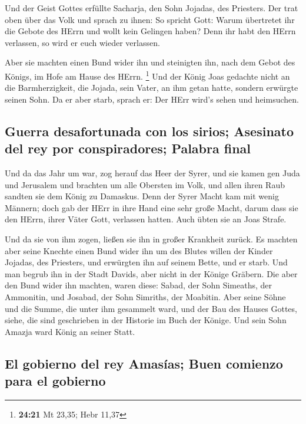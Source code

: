  Und der Geist Gottes erfüllte Sacharja, den Sohn
Jojadas, des Priesters. Der trat oben über das Volk und sprach zu ihnen:
So spricht Gott: Warum übertretet ihr die Gebote des HErrn und wollt
kein Gelingen haben? Denn ihr habt den HErrn verlassen, so wird er euch
wieder verlassen.

 Aber sie machten einen Bund wider ihn und steinigten
ihn, nach dem Gebot des Königs, im Hofe am Hause des HErrn. \footnote{\textbf{24:21}
  Mt 23,35; Hebr 11,37}  Und der König Joas gedachte
nicht an die Barmherzigkeit, die Jojada, sein Vater, an ihm getan hatte,
sondern erwürgte seinen Sohn. Da er aber starb, sprach er: Der HErr
wird's sehen und heimsuchen.

\hypertarget{guerra-desafortunada-con-los-sirios-asesinato-del-rey-por-conspiradores-palabra-final}{%
\subsection{Guerra desafortunada con los sirios; Asesinato del rey por
conspiradores; Palabra
final}\label{guerra-desafortunada-con-los-sirios-asesinato-del-rey-por-conspiradores-palabra-final}}

 Und da das Jahr um war, zog herauf das Heer der Syrer,
und sie kamen gen Juda und Jerusalem und brachten um alle Obersten im
Volk, und allen ihren Raub sandten sie dem König zu Damaskus.
 Denn der Syrer Macht kam mit wenig Männern; doch gab der
HErr in ihre Hand eine sehr große Macht, darum dass sie den HErrn, ihrer
Väter Gott, verlassen hatten. Auch übten sie an Joas Strafe.

 Und da sie von ihm zogen, ließen sie ihn in großer
Krankheit zurück. Es machten aber seine Knechte einen Bund wider ihn um
des Blutes willen der Kinder Jojadas, des Priesters, und erwürgten ihn
auf seinem Bette, und er starb. Und man begrub ihn in der Stadt Davids,
aber nicht in der Könige Gräbern.  Die aber den Bund
wider ihn machten, waren diese: Sabad, der Sohn Simeaths, der Ammonitin,
und Josabad, der Sohn Simriths, der Moabitin.  Aber seine
Söhne und die Summe, die unter ihm gesammelt ward, und der Bau des
Hauses Gottes, siehe, die sind geschrieben in der Historie im Buch der
Könige. Und sein Sohn Amazja ward König an seiner Statt.

\hypertarget{el-gobierno-del-rey-amasuxedas-buen-comienzo-para-el-gobierno}{%
\subsection{El gobierno del rey Amasías; Buen comienzo para el
gobierno}\label{el-gobierno-del-rey-amasuxedas-buen-comienzo-para-el-gobierno}}

